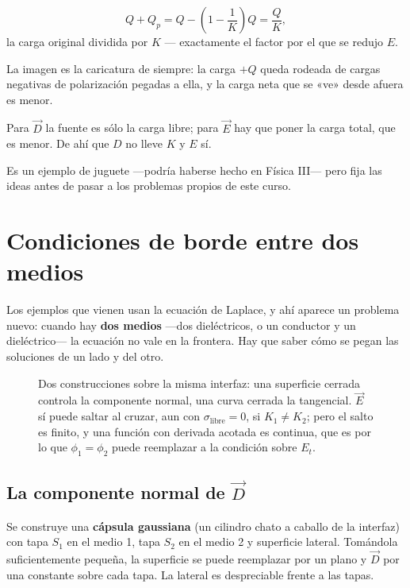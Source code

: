 \documentclass[12pt,a4paper]{article}
\begin{document}
\begin{keybox}
\[
Q + Q_p = Q - \left(1-\frac{1}{K}\right) Q = \frac{Q}{K},
\]
la carga original dividida por $K$ --- exactamente el factor por el que se redujo
$E$.
\end{keybox}

La imagen es la caricatura de siempre: la carga $+Q$ queda rodeada de cargas
negativas de polarización pegadas a ella, y la carga neta que se «ve» desde
afuera es menor.

\begin{notebox}
Para $\vec D$ la fuente es sólo la carga libre; para $\vec E$ hay que poner la
carga total, que es menor. De ahí que $D$ no lleve $K$ y $E$ sí.
\end{notebox}

Es un ejemplo de juguete ---podría haberse hecho en Física III--- pero fija las
ideas antes de pasar a los problemas propios de este curso.

\section{Condiciones de borde entre dos medios}

Los ejemplos que vienen usan la ecuación de Laplace, y ahí aparece un problema
nuevo: cuando hay \textbf{dos medios} ---dos dieléctricos, o un conductor y un
dieléctrico--- la ecuación no vale en la frontera. Hay que saber cómo se pegan
las soluciones de un lado y del otro.

\begin{figure}[H]
  \centering
  
  \caption{Dos construcciones sobre la misma interfaz: una superficie cerrada
  controla la componente normal, una curva cerrada la tangencial. $\vec E$ sí
  puede saltar al cruzar, aun con $\sigma_{\text{libre}}=0$, si $K_1 \neq K_2$;
  pero el salto es finito, y una función con derivada acotada es continua, que
  es por lo que $\phi_1 = \phi_2$ puede reemplazar a la condición sobre $E_t$.}
\end{figure}

\subsection{La componente normal de \texorpdfstring{$\vec D$}{D}}

Se construye una \textbf{cápsula gaussiana} (un cilindro chato a caballo de la
interfaz) con tapa $S_1$ en el medio 1, tapa $S_2$ en el medio 2 y superficie
lateral. Tomándola suficientemente pequeña, la superficie se puede reemplazar por
un plano y $\vec D$ por una constante sobre cada tapa. La lateral es despreciable
frente a las tapas.
\end{document}

